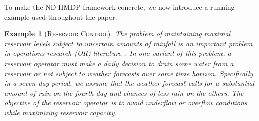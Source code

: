 \documentclass[letterpaper]{article}
\newtheorem*{example*}{Example}
\begin{document}
To make the ND-HMDP framework concrete, we now introduce a running example used
throughout the paper:
\begin{example*}[\textsc{Reservoir Control}]
The problem of maintaining maximal reservoir levels subject to
uncertain amounts of rainfall is an important problem in operations
research (OR) literature~\cite{Mahootchi2009,Yeh1985}.  In one
variant of this problem, a reservoir operator must
make a daily decision to \emph{drain} some water from a reservoir 
or not subject to weather forecasts over some time horizon.
Specifically in a seven day period, we assume that the weather forecast calls for a 
substantial amount of rain on the fourth day and chances of less rain on the
others.  The objective of the reservoir operator is to avoid underflow or
overflow conditions while maximizing reservoir capacity.


\end{example*}
\end{document}
